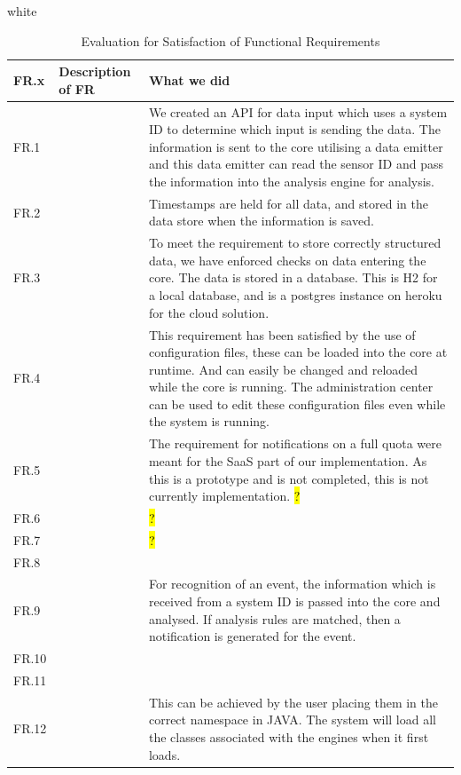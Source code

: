 \documentclass[10pt,a4paper]{article}
\newcommand{\tableformat}[4]{
\begin{table}[ht!]
\centering
  \rowcolors{2}{gray!10} {white}
\begin{tabular}{#1}
  \hline
  \rowcolor[gray]{0.9} #2
\end{tabular}
\caption{#3}
\label{#4}
\end{table}}
\begin{document}
\tableformat{| l | l | l |}{ \hline	FR.x  & 	Description of FR  & 	What we did \\ \hline
	FR.1  & 	  & 	We created an API for data input which uses a system ID to determine which input is sending the data. The information is sent to the core utilising a data emitter and this data emitter can read the sensor ID and pass the information into the analysis engine for analysis. \\ \hline
	FR.2  & 	  & 	Timestamps are held for all data, and stored in the data store when the information is saved. \\ \hline
	FR.3  & 	  & 	To meet the requirement to store correctly structured data, we have enforced checks on data entering the core. The data is stored in a database. This is H2 for a local database, and is a postgres instance on heroku for the cloud solution. \\ \hline
	FR.4  & 	  & 	This requirement has been satisfied by the use of configuration files, these can be loaded into the core at runtime. And can easily be changed and reloaded while the core is running. The administration center can be used to edit these configuration files even while the system is running. \\ \hline
	FR.5  & 	  & 	The requirement for notifications on a full quota were meant for the SaaS part of our implementation. As this is a prototype and is not completed, this is not currently implementation. \hl{?} \\ \hline
	FR.6  & 	  & 	  \hl{?} \\ \hline
	FR.7  & 	  & 	  \hl{?} \\ \hline
	FR.8  & 	  & 	 \\ \hline
	FR.9  & 	  & 	For recognition of an event, the information which is received from a system ID is passed into the core and analysed. If analysis rules are matched, then a notification is generated for the event. \\ \hline
	FR.10  & 	  & 	 \\ \hline
	FR.11  & 	  & 	 \\ \hline
	FR.12  & 	  & 	This can be achieved by the user placing them in the correct namespace in JAVA. The system will load all the classes associated with the engines when it first loads. \\ \hline
}{Evaluation for Satisfaction of Functional Requirements}{frevaltable}
\end{document}
